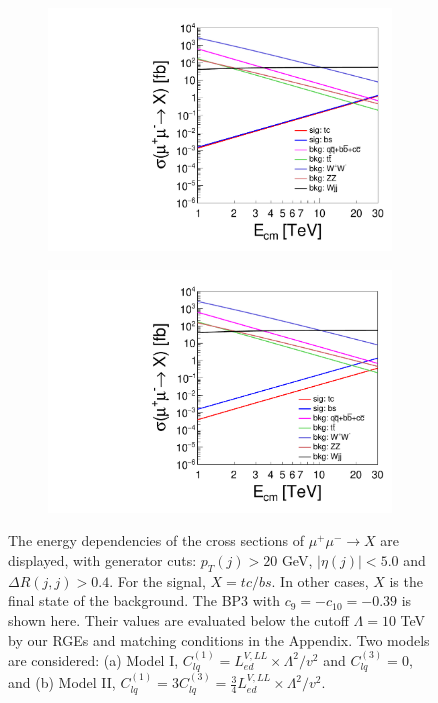 \documentclass[a4paper,11pt]{article}
\begin{document}
\begin{figure}
  \centering
  \captionsetup[sub]{font=large}
  \begin{subfigure}[t]{0.45\textwidth}
     \includegraphics[width=\linewidth]{e_sigma_clq1_only_log.pdf}
     \caption{}
  \end{subfigure}
  \begin{subfigure}[t]{0.45\textwidth}
     \includegraphics[width=\linewidth]{e_sigma_clq1_eq_3clq3_log.pdf}
     \caption{}
  \end{subfigure}
  \caption{The energy dependencies of the cross sections of $\mu^+\mu^-\to X$ are displayed, with generator cuts: $p_T(j)>20$ GeV, $|\eta(j)|<5.0$ and $\Delta R(j,j)>0.4$. For the signal, $X=tc/bs$. In other cases, $X$ is the final state of the background. The BP3 with $c_{9}=-c_{10}=-0.39$ is shown here. Their values are evaluated below the cutoff $\Lambda=10$ TeV by our RGEs and matching conditions in the Appendix. Two models are considered: (a) Model I, $C^{(1)}_{lq}=L^{V,LL}_{ed}\times \Lambda^2/v^2$ and $C^{(3)}_{lq}=0$,  and (b) Model II, $C^{(1)}_{lq}=3C^{(3)}_{lq}=\frac{3}{4}L^{V,LL}_{ed}\times \Lambda^2/v^2$.\label{ecm}}
\end{figure}
\end{document}
